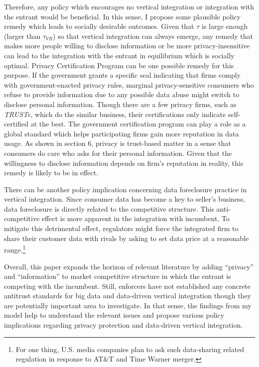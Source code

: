 \documentclass[12pt]{article}
\begin{document}
Therefore, any policy which encourages no vertical integration or integration with the entrant would be beneficial. In this sense, I propose some plausible policy remedy which leads to socially desirable outcomes. Given that $\tau$ is large enough (larger than $\tau_{VB}$) so that vertical integration can always emerge, any remedy that makes more people willing to disclose information or be more privacy-insensitive can lead to the integration with the entrant in equilibrium which is socially optimal. Privacy Certification Program can be one possible remedy for this purpose. If the government grants a specific seal indicating that firms comply with government-enacted privacy rules, marginal privacy-sensitive consumers who refuse to provide information due to any possible data abuse might switch to disclose personal information. Though there are a few privacy firms, such as \textit{TRUSTe}, which do the similar business, their certifications only indicate self-certified at the best. The government certification program can play a role as a global standard which helps participating firms gain more reputation in data usage. As shown in section 6, privacy is trust-based matter in a sense that consumers do care who asks for their personal information. Given that the willingness to disclose information depends on firm's reputation in reality, this remedy is likely to be in effect. 

There can be another policy implication concerning data foreclosure practice in vertical integration. Since consumer data has become a key to seller's business, data foreclosure is directly related to the competitive structure. This anti-competitive effect is more apparent in the integration with incumbent. To mitigate this detrimental effect, regulators might force the integrated firm to share their customer data with rivals by asking to set data price at a reasonable range.\footnote{For one thing, U.S. media companies plan to ask such data-sharing related regulation in response to AT\&T and Time Warner merger.} 

Overall, this paper expands the horizon of relevant literature by adding ``privacy'' and ``information'' to market competitive structure in which the entrant is competing with the incumbent. Still, enforcers have not established any concrete antitrust standards for big data and data-driven vertical integration though they are potentially important area to investigate. In that sense, the findings from my model help to understand the relevant issues and propose various policy implications regarding privacy protection and data-driven vertical integration. 
\end{document}
